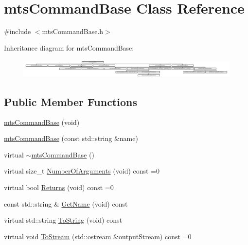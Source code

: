 \hypertarget{classmts_command_base}{\section{mts\-Command\-Base Class Reference}
\label{classmts_command_base}
}


{\ttfamily \#include $<$mts\-Command\-Base.\-h$>$}

Inheritance diagram for mts\-Command\-Base\-:\begin{figure}[H]
\begin{center}
\leavevmode
\includegraphics[height=1.016703cm]{dc/df0/classmts_command_base}
\end{center}
\end{figure}
\subsection*{Public Member Functions}
\begin{DoxyCompactItemize}
\item 
\hyperlink{classmts_command_base_af88b0fa085b33e9c2232c69218900106}{mts\-Command\-Base} (void)
\item 
\hyperlink{classmts_command_base_aec8441f140eb603abc84e0d047a62fab}{mts\-Command\-Base} (const std\-::string \&name)
\item 
virtual \hyperlink{classmts_command_base_a45ce5ab9a51430b61949beb6fc206c01}{$\sim$mts\-Command\-Base} ()
\item 
virtual size\-\_\-t \hyperlink{classmts_command_base_abde89dfcf0078294f634c232b7537cc3}{Number\-Of\-Arguments} (void) const =0
\item 
virtual bool \hyperlink{classmts_command_base_a0217171a8e7bead32766e94748e11658}{Returns} (void) const =0
\item 
const std\-::string \& \hyperlink{classmts_command_base_ad5c99e2aa1e1a5a13956ace724cb1bc1}{Get\-Name} (void) const 
\end{DoxyCompactItemize}
{\bf }\par
\begin{DoxyCompactItemize}
\item 
virtual std\-::string \hyperlink{classmts_command_base_aec9da20bd72f07b52055dce6e8ebd4c0}{To\-String} (void) const 
\item 
virtual void \hyperlink{classmts_command_base_a0885ce7a5321d7b672694ade780b9d64}{To\-Stream} (std\-::ostream \&output\-Stream) const =0
\end{DoxyCompactItemize}


